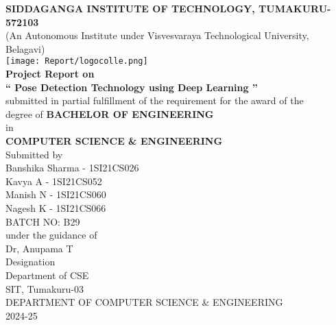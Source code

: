 \documentclass[a4paper,12pt]{report}
\begin{document}
\begin{titlepage}
    \centering
    \normalsize
    \textbf{SIDDAGANGA INSTITUTE OF TECHNOLOGY, TUMAKURU-572103} \\[0.2cm]
    (An Autonomous Institute under Visvesvaraya Technological University, Belagavi) \\[0.2cm]

    \texttt{[image: Report/logocolle.png]} \\[0.2cm] %

    \textbf{Project Report on} \\[0.2cm]
    \textbf{`` Pose Detection Technology using Deep Learning ''} \\[0.5cm]

    \normalsize
    submitted in partial fulfillment of the requirement for the award of the \\[0.3cm]
    degree of \textbf{BACHELOR OF ENGINEERING} \\[0.1cm]
    in \\[0.1cm]
    \textbf{COMPUTER SCIENCE \& ENGINEERING} \\[0.1cm]

    Submitted by \\[0.2cm]
    Banshika Sharma - 1SI21CS026 \\[0.1cm]
    Kavya A - 1SI21CS052 \\[0.1cm]
    Manish N - 1SI21CS060 \\[0.1cm]
    Nagesh K - 1SI21CS066 \\[0.3cm]

    \Large
    BATCH NO: B29 \\[0.1cm]
    under the guidance of \\[0.1cm]
    Dr, Anupama T \\[0.1cm]
    Designation \\[0.1cm]

    \Large
    Department of CSE \\[0.1cm]
    SIT, Tumakuru-03 \\[0.1cm]

    \textsc{}{DEPARTMENT OF COMPUTER SCIENCE \& ENGINEERING} \\[0.1cm]

    2024-25
\end{titlepage}
\end{document}
